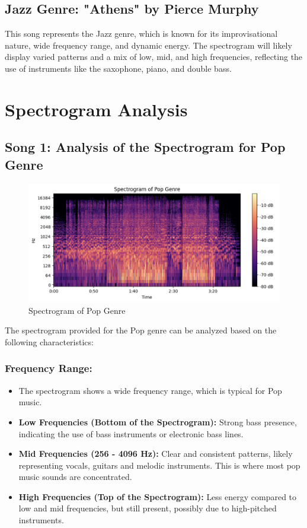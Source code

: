 \documentclass[a4paper,12pt]{article}
\begin{document}
\subsection{Jazz Genre: "Athens" by Pierce Murphy}
This song represents the Jazz genre, which is known for its improvisational nature, wide frequency range, and dynamic energy. The spectrogram will likely display varied patterns and a mix of low, mid, and high frequencies, reflecting the use of instruments like the saxophone, piano, and double bass.
\newpage
\section{Spectrogram Analysis}
\subsection{Song 1: Analysis of the Spectrogram for Pop Genre}
\begin{figure}[H]
    \centering
    \includegraphics[width=1\linewidth]{1.png}
    \caption{Spectrogram of Pop Genre}
\end{figure}
The spectrogram provided for the Pop genre can be analyzed based on the following characteristics:
\subsubsection{Frequency Range:}
\begin{itemize}
    \item The spectrogram shows a wide frequency range, which is typical for Pop music.
    \item \textbf{Low Frequencies (Bottom of the Spectrogram):} Strong bass presence, indicating the use of bass instruments or electronic bass lines.
\item \textbf{Mid Frequencies (256 - 4096 Hz):} Clear and consistent patterns, likely representing vocals, guitars and melodic instruments. This is where most pop music sounds are concentrated.
\item \textbf{High Frequencies (Top of the Spectrogram):} Less energy compared to low and mid frequencies, but still present, possibly due to high-pitched instruments.
\end{itemize}
\end{document}
